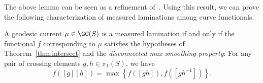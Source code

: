 The above lemma can be seen as a refinement of~\cite[Lemma~5.6]{NCS23:Property}.
Using this result, we can prove the following characterization of measured laminations among curve functionals.

\begin{theorem}
A geodesic current $\mu \in \GC(S)$ is a measured lamination if and only if the functional $f$ corresponding to $\mu$ satisfies the hypotheses of Theorem~\ref{thm:intersect} and the \emph{disconnected max-smoothing property}:
    For any pair of crossing elements $g,h \in \pi_1(S)$, we have
    \begin{equation}\label{eq:disconn-max-smoothing}
      f\left([g][h]\right) = \max \left\{ f\left([gh]\right),f\left([gh^{-1}]\right) \right\}.
    \end{equation}
    \label{thm:char_laminations}
\end{theorem}
